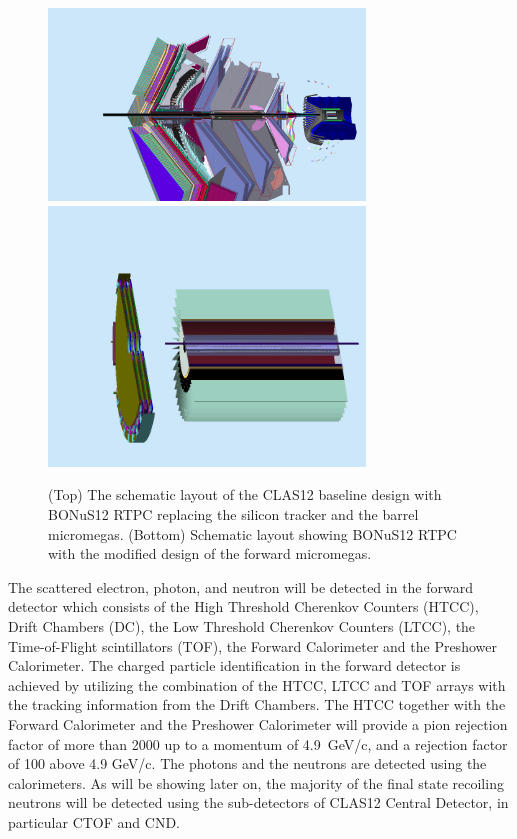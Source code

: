 \begin{figure}
  \begin{center}
    \includegraphics[angle=0, width=0.75\textwidth]{figures/clas12_bonus12.png}
    \includegraphics[angle=0, width=0.75\textwidth,clip, trim = 0mm 10mm 0mm 
     40mm]{figures/bonus12_fmt.png}
     \caption{(Top) The schematic layout of the CLAS12 baseline design with 
     BONuS12 RTPC replacing the silicon tracker and the barrel micromegas.  
     (Bottom) Schematic layout showing BONuS12 RTPC with the modified design of 
     the forward micromegas.}
    \label{fig:fd}
  \end{center}
\end{figure}


The scattered electron, photon, and neutron will be detected in the forward 
detector which consists of the High Threshold Cherenkov Counters (HTCC), Drift 
Chambers (DC), the Low Threshold Cherenkov Counters (LTCC), the Time-of-Flight 
scintillators (TOF), the Forward Calorimeter and the Preshower Calorimeter. The 
charged particle identification in the forward detector is achieved by 
utilizing the combination of the HTCC, LTCC and TOF arrays with the tracking 
information from the Drift Chambers. The HTCC together with the Forward 
Calorimeter and the Preshower Calorimeter will provide a pion rejection factor 
of more than 2000 up to a momentum of 4.9~GeV/c, and a rejection factor of 100 
above 4.9 GeV/c. The photons and the neutrons are detected using the 
calorimeters. As will be showing later on, the majority of the final state 
recoiling neutrons will be detected using the sub-detectors of CLAS12 Central 
Detector, in particular CTOF and CND. 

